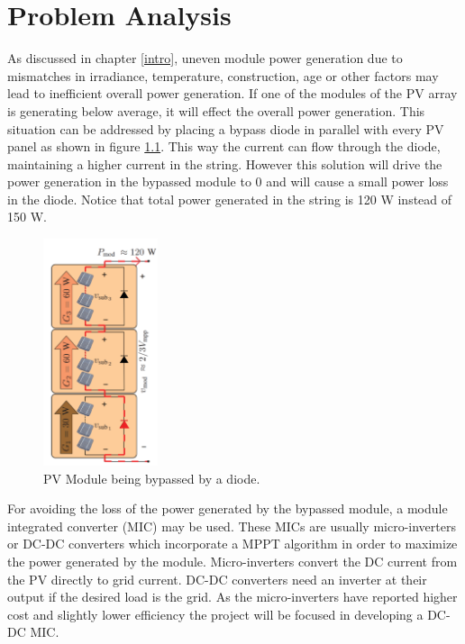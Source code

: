 \chapter{Problem Analysis}

As discussed in chapter \ref{intro}, uneven module power generation due to mismatches in irradiance, temperature, construction, age or other factors may lead to inefficient overall power generation. If one of the modules of the PV array is generating below average, it will effect the overall power generation. This situation can be addressed by placing a bypass diode in parallel with every PV panel as shown in figure \ref{BYPASSED_MODULE}. This way the current can flow through the diode, maintaining a higher current in the string. However this solution will drive the power generation in the bypassed module to 0 and will cause a small power loss in the diode. Notice that total power generated in the string is 120 W instead of 150 W. 

\begin{figure}[htbp]
	\begin{center}
		\includegraphics[width=0.3\textwidth]{../Pictures/Uneven_generation}
		\caption{PV Module being bypassed by a diode.  %
		}
		\label{BYPASSED_MODULE}
	\end{center}	
\end{figure}

For avoiding the loss of the power generated by the bypassed module, a module integrated converter (MIC) may be used. %
These MICs are usually micro-inverters or DC-DC converters which incorporate a MPPT algorithm in order to maximize the power generated by the module. 
Micro-inverters convert the DC current from the PV directly to grid current. DC-DC converters need an inverter at their output if the desired load is the grid. 
As the micro-inverters have reported higher cost and slightly lower efficiency %
the project will be focused in developing a DC-DC MIC. 





